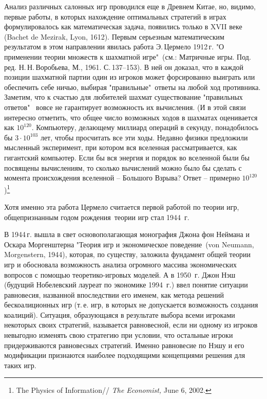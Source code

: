 \documentclass[12pt]{article}
\begin{document}
Анализ различных салонных игр проводился еще в Древнем Китае, но,
видимо, первые работы, в которых нахождение оптимальных стратегий в
играх формулировалось как математическая задача, появились только в
XVII веке (Bachet de Mezirak, Lyon, 1612). Первым серьезным
математическим результатом в этом направлении явилась работа
Э.\,Цермело 1912\,г.  "О применении теории множеств к шахматной
игре"\, (см.: Матричные игры. Под. ред. Н.\,Н.\,Воробьева, М., 1961.
С.\,137--153). В ней он доказал, что в каждой позиции шахматной
партии один из игроков может форсированно выиграть или обеспечить
себе ничью, выбирая "правильные"\, ответы на любой ход противника.
Заметим, что  к счастью для любителей шахмат существование
"правильных ответов" \, вовсе не гарантирует возможность их
вычисления. (И в этой связи интересно отметить, что общее число
возможных ходов в шахматах оценивается как $10^{120}$. Компьютеру,
делающему миллиард операций в секунду, понадобилось бы $3\cdot10^{103}$
лет, чтобы просчитать все эти ходы. Недавно физики предложили
мысленный эксперимент, при котором вся вселенная рассматривается,
как гигантский компьютер. Если бы вся энергия и порядок во вселенной
были бы посвящены вычислениям, то сколько вычислений можно было бы
сделать с момента происхождения вселенной -- Большого Взрыва?
Ответ -- примерно $10^{120}$)\footnote{The Physics of Information//
\emph{The Economist, } June 6, 2002.}

Хотя именно эта работа Цермело считается первой работой по теории игр,
общепризнанным годом рождения\, теории игр стал 1944~г.

В 1944\,г. вышла в свет основополагающая монография Джона фон
Неймана и Оскара Моргенштерна "Теория игр и экономическое
поведение\, (von Neumann, Morgenstern, 1944), которая, по существу,
заложила фундамент общей теории игр и обосновала возможность анализа
огромного массива экономических вопросов с помощью теоретико-игровых
моделей.  А в 1950~г. Джон Нэш (будущий Нобелевский лауреат по
экономике 1994~г.) ввел понятие ситуации равновесия, названной
впоследствии его именем, как метода решений бескоалиционных игр
(т.\,е. игр, в которых не допускается возможность создания
коалиций).  Ситуация, образующаяся в результате выбора всеми
игроками некоторых своих стратегий, называется равновесной, если ни
одному из игроков невыгодно изменять свою стратегию при условии, что
остальные игроки придерживаются равновесных стратегий. Именно
равновесие по Нэшу и его модификации признаются наиболее подходящими
концепциями решения для таких игр.
\end{document}
